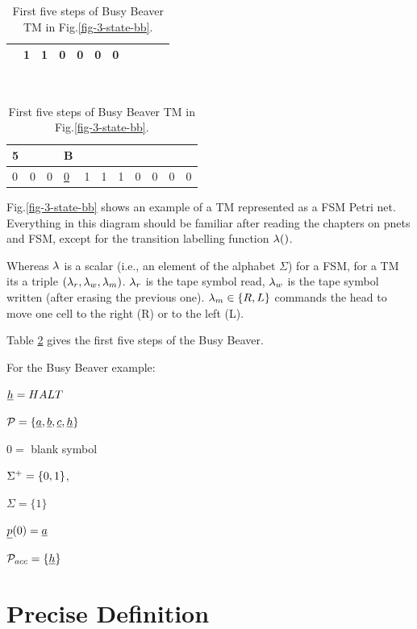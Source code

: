 \begin{table}[h!]
\begin{tabular}{lllllllllll}
& \multicolumn{1}{l|}{1} 
& \multicolumn{1}{l|}{\cellcolor[HTML]{FFFFC7}1} 
& \multicolumn{1}{l|}{0} 
& \multicolumn{1}{l|}{\cellcolor[HTML]{FFFFC7}0} 
& \multicolumn{1}{l|}{0} 
& \multicolumn{1}{l|}{\cellcolor[HTML]{FFFFC7}0} 
\\ \hline
\end{tabular}
\\
\begin{tabular}{lllllllllll}
5 &  &  & B & & &  &  &  &  &  
\\ \hline
\multicolumn{1}{|l|}{\cellcolor[HTML]{FFFFC7}0} 
& \multicolumn{1}{l|}{0} 
& \multicolumn{1}{l|}{\cellcolor[HTML]{FFFFC7}0} 
& \multicolumn{1}{l|}{\ul{0}} 
& \multicolumn{1}{l|}{\cellcolor[HTML]{FFFFC7}1} 
& \multicolumn{1}{l|}{1} 
& \multicolumn{1}{l|}{\cellcolor[HTML]{FFFFC7}1} 
& \multicolumn{1}{l|}{0} 
& \multicolumn{1}{l|}{\cellcolor[HTML]{FFFFC7}0} 
& \multicolumn{1}{l|}{0} 
& \multicolumn{1}{l|}{\cellcolor[HTML]{FFFFC7}0} 
\\ \hline
\end{tabular}
\caption{First five steps of Busy Beaver TM 
in Fig.\ref{fig-3-state-bb}. }
\label{tab-busy-beaver}
\end{table}

Fig.\ref{fig-3-state-bb} shows an example of
a TM represented as a FSM Petri net. Everything in this diagram
should be familiar after reading the chapters
on pnets and FSM, except for the
transition  labelling function $\lambda()$.

Whereas $\lambda$ is a scalar (i.e., an element of the alphabet $\Sigma$)
for a FSM, for a TM its a triple $(\lambda_r, \lambda_w, \lambda_m)$.
$\lambda_r$ is the tape symbol read, $\lambda_w$
is the tape symbol written (after erasing the 
previous one). $\lambda_m\in\{R, L\}$
commands the head to move one cell to the right (R)
or to the left (L).

Table \ref{tab-busy-beaver} gives the first five 
steps of the  Busy Beaver.

For the Busy Beaver example:

$\rvh=HALT$

$\calp= \{\rva, \rvb, \rvc, \rvh\}$  

$0=$ blank symbol

$\Sigma^+ =\{0,1\}$, 

$\Sigma = \{1\}$

$\rvp(0)=\rva$

$\calp_{acc} =\{\rvh \}$




\section{Precise Definition}

